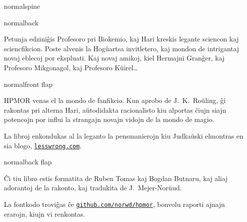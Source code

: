 \documentclass[12pt,coverwidth=\the\hpcoverwidth,coverheight=\the\hpcoverheight,spinewidth=\the\hpspinewidth,marklength=0mm,bleedwidth=5mm,flapwidth=63mm]{bookcover}
\begin{document}
\begin{bookcover}

\begin{bookcoverelement}{normal}{spine}
\centering
\color{white}\scshape
\vspace{0.5cm}\huge \volumenumber\\[2ex]\Large
\vfill
{}
\vfill
\end{bookcoverelement}

\begin{bookcoverelement}{normal}{back}
  \centering
  \vspace{20mm}
  \parbox{110mm}{\color{white}\Large\raggedright
Petunja edziniĝis Profesoro pri Biokemio, kaj Hari kreskis legante sciencon kaj sciencfikcion. Poste alvenis la Hogŭartsa invitletero, kaj mondon de intrigantaj novaj eblecoj por ekspluati. Kaj novaj amikoj, kiel Hermajni Granĝer, kaj Profesoro Mikgonagol, kaj Profesoro Kŭirel…
}
\end{bookcoverelement}

\begin{bookcoverelement}{normal}{front flap}
\centering
\vspace{20mm}
\parbox{40mm}{\color{white}\raggedright\small
  HPMOR venas el la mondo de fanfikcio. Kun aprobo de J.~K.~Roŭling, ĝi rakontas pri alterna Hari, aŭtodidakta racionalisto kiu alportas ĉiujn siajn potencojn por influi la strangajn novajn vidojn de la mondo de magio.

  \bigskip La libroj enkondukas al la leganto la pensmanierojn kiu Judkaŭski elmontras en sia blogo, \href{https://lesswrong.com}{\texttt{lesswrong.com}}.}
\end{bookcoverelement}

\begin{bookcoverelement}{normal}{back flap}
\centering
\vspace{20mm}
\parbox{40mm}{\color{white}\small\raggedright
  Ĉi tiu libro estis formatita de Ruben Tomas kaj Bogdan Butnaru, kaj aliaj adorantoj de la rakonto, kaj tradukita de J.~Mejer\nobreakdash-Norŭud.

  \bigskip La fontkodo troviĝas ĉe \href{https://github.com/norwd/hpmor}{\texttt{github.com/norwd/hpmor}}, bonvolu raporti ajnajn erarojn, kiujn vi renkontas.
}
\end{bookcoverelement}

\end{bookcover}
\end{document}
